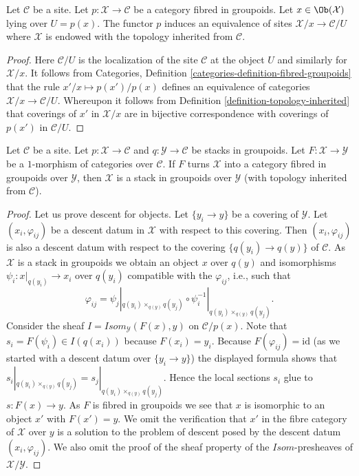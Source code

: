 \begin{lemma}
\label{lemma-localizing}
Let $\mathcal{C}$ be a site. Let $p : \mathcal{X} \to \mathcal{C}$
be a category fibred in groupoids. Let $x \in \Ob(\mathcal{X})$
lying over $U = p(x)$. The functor $p$ induces an equivalence of sites
$\mathcal{X}/x \to \mathcal{C}/U$ where $\mathcal{X}$ is endowed with
the topology inherited from $\mathcal{C}$.
\end{lemma}

\begin{proof}
Here $\mathcal{C}/U$ is the localization of the site
$\mathcal{C}$ at the object $U$ and similarly for $\mathcal{X}/x$.
It follows from
Categories, Definition \ref{categories-definition-fibred-groupoids}
that the rule $x'/x \mapsto p(x')/p(x)$ defines an equivalence of
categories $\mathcal{X}/x \to \mathcal{C}/U$. Whereupon it follows from
Definition \ref{definition-topology-inherited}
that coverings of $x'$ in $\mathcal{X}/x$ are in bijective correspondence
with coverings of $p(x')$ in $\mathcal{C}/U$.
\end{proof}

\begin{lemma}
\label{lemma-stack-in-groupoids-over-stack-in-groupoids}
Let $\mathcal{C}$ be a site. Let $p : \mathcal{X} \to \mathcal{C}$
and $q : \mathcal{Y} \to \mathcal{C}$
be stacks in groupoids. Let $F : \mathcal{X} \to \mathcal{Y}$
be a $1$-morphism of categories over $\mathcal{C}$. If $F$ turns
$\mathcal{X}$ into a category fibred in groupoids over $\mathcal{Y}$,
then $\mathcal{X}$ is a stack in groupoids over $\mathcal{Y}$ (with
topology inherited from $\mathcal{C}$).
\end{lemma}

\begin{proof}
Let us prove descent for objects. Let $\{y_i \to y\}$ be a covering
of $\mathcal{Y}$. Let $(x_i, \varphi_{ij})$ be a descent datum in $\mathcal{X}$
with respect to this covering. Then $(x_i, \varphi_{ij})$ is also a descent
datum with respect to the covering $\{q(y_i) \to q(y)\}$ of
$\mathcal{C}$. As $\mathcal{X}$ is a stack in groupoids we obtain an
object $x$ over $q(y)$ and isomorphisms $\psi_i : x|_{q(y_i)} \to x_i$
over $q(y_i)$ compatible with the $\varphi_{ij}$, i.e., such that
$$
\varphi_{ij} = \psi_j|_{q(y_i) \times_{q(y)} q(y_j)}
\circ \psi_i^{-1}|_{q(y_i) \times_{q(y)} q(y_j)}.
$$
Consider the sheaf $\mathit{I} = \mathit{Isom}_\mathcal{Y}(F(x), y)$
on $\mathcal{C}/p(x)$. Note that $s_i = F(\psi_i) \in \mathit{I}(q(x_i))$
because $F(x_i) = y_i$. Because $F(\varphi_{ij}) = \text{id}$ (as we started
with a descent datum over $\{y_i \to y\}$) the displayed formula shows
that $s_i|_{q(y_i) \times_{q(y)} q(y_j)} = s_j|_{q(y_i) \times_{q(y)} q(y_j)}$.
Hence the local sections $s_i$ glue to $s : F(x) \to y$. As $F$ is fibred in
groupoids we see that $x$ is isomorphic to an object $x'$ with $F(x') = y$.
We omit the verification that $x'$ in the fibre category of $\mathcal{X}$
over $y$ is a solution to the problem of descent posed by the descent datum
$(x_i, \varphi_{ij})$. We also omit the proof of the sheaf property
of the $\mathit{Isom}$-presheaves of $\mathcal{X}/\mathcal{Y}$.
\end{proof}

